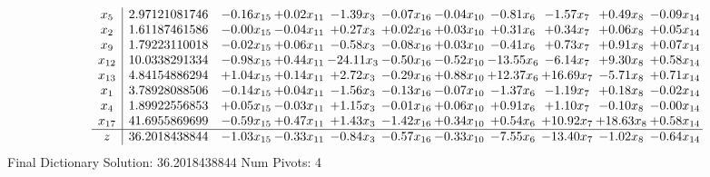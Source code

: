\documentclass[9pt]{article}
\begin{document}
 \[\begin{array}{c| c c@{\hskip 2pt} c@{\hskip 2pt} c@{\hskip 2pt} c@{\hskip 2pt} c@{\hskip 2pt} c@{\hskip 2pt} c@{\hskip 2pt} c@{\hskip 2pt} c@{\hskip 2pt} }
 x_{5}   &  2.97121081746 & -0.16 x_{15} & +  0.02 x_{11} & -1.39 x_{3} & -0.07 x_{16} & -0.04 x_{10} & -0.81 x_{6} & -1.57 x_{7} & +  0.49 x_{8} & -0.09 x_{14}\\
 x_{2}   &  1.61187461586 & -0.00 x_{15} & -0.04 x_{11} & +  0.27 x_{3} & +  0.02 x_{16} & +  0.03 x_{10} & +  0.31 x_{6} & +  0.34 x_{7} & +  0.06 x_{8} & +  0.05 x_{14}\\
 x_{9}   &  1.79223110018 & -0.02 x_{15} & +  0.06 x_{11} & -0.58 x_{3} & -0.08 x_{16} & +  0.03 x_{10} & -0.41 x_{6} & +  0.73 x_{7} & +  0.91 x_{8} & +  0.07 x_{14}\\
 x_{12}   &  10.0338291334 & -0.98 x_{15} & +  0.44 x_{11} & -24.11 x_{3} & -0.50 x_{16} & -0.52 x_{10} & -13.55 x_{6} & -6.14 x_{7} & +  9.30 x_{8} & +  0.58 x_{14}\\
 x_{13}   &  4.84154886294 & +  1.04 x_{15} & +  0.14 x_{11} & +  2.72 x_{3} & -0.29 x_{16} & +  0.88 x_{10} & + 12.37 x_{6} & + 16.69 x_{7} & -5.71 x_{8} & +  0.71 x_{14}\\
 x_{1}   &  3.78928088506 & -0.14 x_{15} & +  0.04 x_{11} & -1.56 x_{3} & -0.13 x_{16} & -0.07 x_{10} & -1.37 x_{6} & -1.19 x_{7} & +  0.18 x_{8} & -0.02 x_{14}\\
 x_{4}   &  1.89922556853 & +  0.05 x_{15} & -0.03 x_{11} & +  1.15 x_{3} & -0.01 x_{16} & +  0.06 x_{10} & +  0.91 x_{6} & +  1.10 x_{7} & -0.10 x_{8} & -0.00 x_{14}\\
 x_{17}   &  41.6955869699 & -0.59 x_{15} & +  0.47 x_{11} & +  1.43 x_{3} & -1.42 x_{16} & +  0.34 x_{10} & +  0.54 x_{6} & + 10.92 x_{7} & + 18.63 x_{8} & +  0.58 x_{14}\\
\hline
z    &  36.2018438844 & -1.03 x_{15} & -0.33 x_{11} & -0.84 x_{3} & -0.57 x_{16} & -0.33 x_{10} & -7.55 x_{6} & -13.40 x_{7} & -1.02 x_{8} & -0.64 x_{14}\\
\end{array}\]
Final Dictionary
Solution:  36.2018438844
Num Pivots:  4
\end{document}
